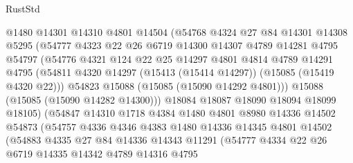 \begin{lexlean}{RustStd}
\begin{coremodule}
                    @1480
                    @14301
                    @14310
                    @4801
                    @14504
                    (@54768
                      @4324
                      @27
                      @84
                      @14301
                      @14308
                      @5295
                      (@54777
                        @4323
                        @22
                        @26
                        @6719
                        @14300
                        @14307
                        @4789
                        @14281
                        @4795
                        @54797
                        (@54776
                          @4321
                          @124
                          @22
                          @25
                          @14297
                          @4801
                          @4814
                          @4789
                          @14291
                          @4795
                          (@54811 @4320 @14297 (@15413 (@15414 @14297)) (@15085 (@15419 @4320 @22)))
                          @54823
                          @15088
                          (@15085 (@15090 @14292 @4801)))
                        @15088
                        (@15085 (@15090 @14282 @14300)))
                      @18084
                      @18087
                      @18090
                      @18094
                      @18099
                      @18105)
                    (@54847
                      @14310
                      @1718
                      @4384
                      @1480
                      @4801
                      @8980
                      @14336
                      @14502
                      @54873
                      (@54757
                        @4336
                        @4346
                        @4383
                        @1480
                        @14336
                        @14345
                        @4801
                        @14502
                        (@54883
                          @4335
                          @27
                          @84
                          @14336
                          @14343
                          @11291
                          (@54777
                            @4334
                            @22
                            @26
                            @6719
                            @14335
                            @14342
                            @4789
                            @14316
                            @4795

\end{coremodule}
\end{lexlean}
